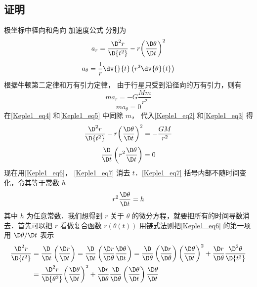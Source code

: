 \subsection{证明}
极坐标中径向和角向%
加速度公式%
分别为
\begin{equation}\label{Keple1_eq2}
{a_r} = \frac{{{\D^2}r}}{{\D{t^2}}} - r{\left( {\frac{{\D\theta }}{{\D t}}} \right)^2}
\end{equation}
\begin{equation}\label{Keple1_eq3}
a_\theta = \frac{1}{r}\dv{}{t}\left(r^2\dv{\theta}{t} \right)
\end{equation}
根据牛顿第二定律和万有引力定律，%
由于行星只受到沿径向的万有引力，则有
\begin{equation}\label{Keple1_eq4}
m{a_r} =  - G\frac{{Mm}}{{{r^2}}}
\end{equation}
\begin{equation}\label{Keple1_eq5}
m{a_\theta } = 0
\end{equation}
在\autoref{Keple1_eq4} 和\autoref{Keple1_eq5} 中同除 $m$，  代入\autoref{Keple1_eq2} 和\autoref{Keple1_eq3} 得
\begin{equation}\label{Keple1_eq6}
\frac{{{\D^2}r}}{{\D{t^2}}} - r{\left( {\frac{{\D\theta }}{{\D t}}} \right)^2} =  - \frac{{GM}}{{{r^2}}}
\end{equation}
\begin{equation}\label{Keple1_eq7}
\frac{\D}{{\D t}}\left( {{r^2}\frac{{\D\theta }}{{\D t}}} \right) = 0
\end{equation}
现在用\autoref{Keple1_eq6}， \autoref{Keple1_eq7} 消去 $t$．\autoref{Keple1_eq7} 括号内部不随时间变化，令其等于常数 $h$
\begin{equation}\label{Keple1_eq8}
{r^2}\frac{{\D\theta }}{{\D t}} = h
\end{equation}
其中 $h$ 为任意常数．我们想得到 $r$ 关于 $\theta$ 的微分方程，就要把所有的时间导数消去．首先可以把 $r$ 看做复合函数 $r(\theta(t))$ 用链式法则把\autoref{Keple1_eq6} 的第一项用 $\D\theta/\D t$ 表示
\begin{equation}\label{Keple1_eq10}
\begin{aligned}
\frac{{{\D^2}r}}{{\D{t^2}}} & = \frac{\D}{{\D t}}\left(\frac{{\D r}}{{\D t}}\right) = \frac{\D}{{\D t}}\left( {\frac{{\D r}}{{\D\theta }}\frac{{\D\theta }}{{\D t}}} \right) = \frac{\D}{{\D\theta }}\left( {\frac{{\D r}}{{\D\theta }}} \right){\left( {\frac{{\D\theta }}{{\D t}}} \right)^2} + \frac{{\D r}}{{\D\theta }}\frac{{{\D^2}\theta }}{{\D{t^2}}}\\
& = \frac{{{\D^2}r}}{{\D{\theta ^2}}}{\left( {\frac{{\D\theta }}{{\D t}}} \right)^2} + \frac{{\D r}}{{\D\theta }}\frac{\D}{{\D\theta }}\left( {\frac{{\D\theta }}{{\D t}}} \right)\frac{{\D\theta }}{{\D t}}
\end{aligned}
\end{equation}
